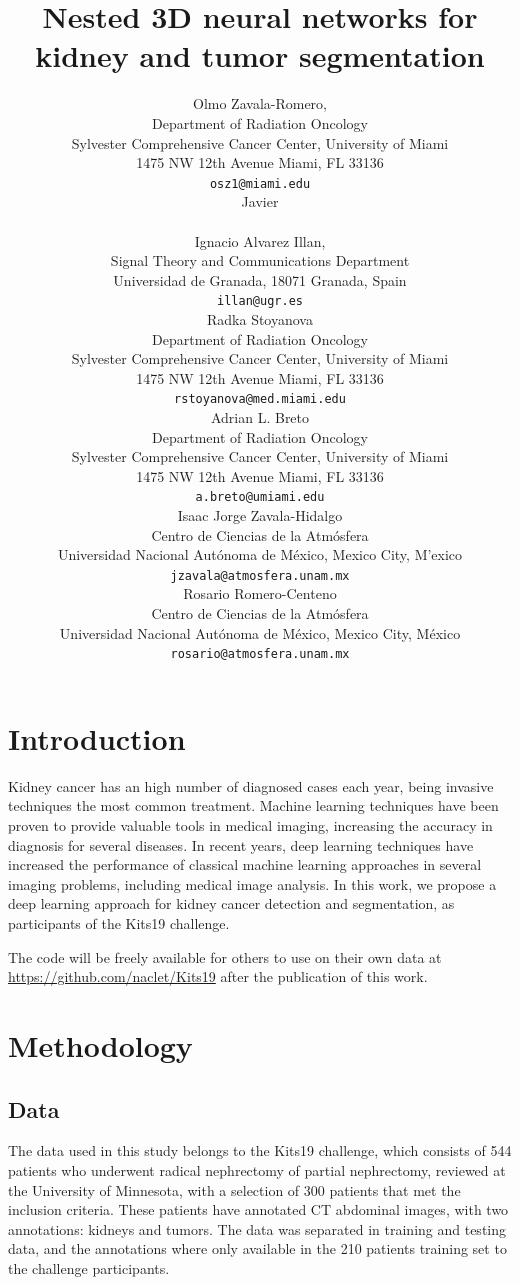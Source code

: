 \documentclass{article}
\title{Nested 3D neural networks for kidney and tumor segmentation}
\author{
  Olmo Zavala-Romero,\\
  Department of Radiation Oncology\\
  Sylvester Comprehensive Cancer Center, University of Miami\\
  1475 NW 12th Avenue Miami, FL 33136\\
  \texttt{osz1@miami.edu} \\
  \And
  Javier \\
  \texttt{} \\
  \AND
  Ignacio Alvarez Illan,\\
  Signal Theory and Communications Department\\
  Universidad de Granada, 18071 Granada, Spain\\
  \texttt{illan@ugr.es} \\
  \AND
  Radka Stoyanova\\
  Department of Radiation Oncology\\
  Sylvester Comprehensive Cancer Center, University of Miami\\
  1475 NW 12th Avenue Miami, FL 33136\\
  \texttt{rstoyanova@med.miami.edu} \\
  \AND
 Adrian L. Breto\\
 Department of Radiation Oncology\\
 Sylvester Comprehensive Cancer Center, University of Miami\\
 1475 NW 12th Avenue
 Miami, FL 33136\\
 \texttt{a.breto@umiami.edu} \\
  \AND
Isaac
 \AND
  Jorge Zavala-Hidalgo\\
  Centro de Ciencias de la Atm\'osfera\\
  Universidad Nacional Aut\'onoma de M\'exico, Mexico City, M'exico\\
  \texttt{jzavala@atmosfera.unam.mx} \\
  \AND
  Rosario Romero-Centeno\\
  Centro de Ciencias de la Atm\'osfera\\
  Universidad Nacional Aut\'onoma de M\'exico, Mexico City, M\'exico\\
  \texttt{rosario@atmosfera.unam.mx} \\
}
\begin{document}
\maketitle

\begin{abstract}

\end{abstract}



\section{Introduction}
\label{sec:intro}

Kidney cancer has an high number of diagnosed cases each year, being invasive techniques the most common treatment\cite{sun_treatment_2012}. Machine learning techniques have been proven to provide valuable tools in medical imaging, increasing the accuracy in diagnosis for several diseases\cite{erickson_machine_2017}. In recent years, deep learning techniques have increased the performance of classical machine learning approaches in several imaging problems, including medical image analysis\cite{litjens_survey_2017}. In this work, we propose a deep learning approach for kidney cancer detection and segmentation, as participants of the Kits19 challenge.


The code will be freely available for others to use on their own data at \url{https://github.com/naclet/Kits19} after
the publication of this work. 

\section{Methodology}
\label{sec:methods}

\subsection{Data}
\label{sec:data}

The data used in this study belongs to the Kits19 challenge\cite{heller_kits19_2019}, which consists of 544 patients who underwent radical nephrectomy of partial nephrectomy, reviewed at the University of Minnesota, with a selection of 300 patients that met the inclusion criteria. These patients have annotated CT abdominal images, with two annotations: kidneys and tumors. The data was separated in training and testing data, and the annotations where only available in the 210 patients training set to the challenge participants. 
\end{document}
